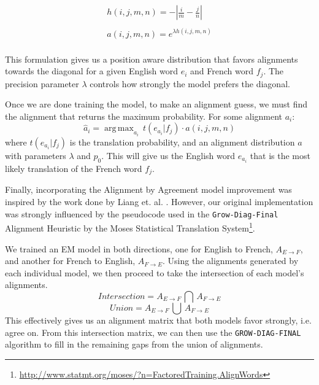 \documentclass[twoside,twocolumn]{article}
\DeclareMathOperator*{\argmax}{arg\,max}
\begin{document}
\begin{equation}
\begin{split}
h(i,j,m,n) = - \left| \frac{i}{m} - \frac{j}{n}\right| \\
\\
a(i,j,m,n) =e^{  \lambda h(i,j,m,n)} \\
\end{split}
\end{equation}

This formulation gives us a position aware distribution that favors alignments towards the diagonal for a given English word $e_i$ and French word $f_j$. The precision parameter $\lambda$ controls how strongly the model prefers the diagonal.

Once we are done training the model, to make an alignment guess, we must find the alignment that returns the maximum probability. For some alignment $a_i$:
\begin{equation}
\hat{a}_i = \argmax_{a_i} \, t(e_{a_i}|f_j) \cdot a(i, j, m, n)
\end{equation}
where $t(e_{a_i}|f_j)$ is the translation probability, and an alignment distribution $a$ with parameters $\lambda$ and $p_0$. This will give us the English word $e_{a_i}$ that is the most likely translation of the French word $f_j$.

Finally, incorporating the Alignment by Agreement model improvement was inspired by the work done by Liang et. al. \cite{liang2006alignment}. However, our original implementation was strongly influenced by the pseudocode used in the \texttt{Grow-Diag-Final} Alignment Heuristic by the Moses Statistical Translation System\footnote{\url{http://www.statmt.org/moses/?n=FactoredTraining.AlignWords}}.

We trained an EM model in both directions, one for English to French, $A_{E \rightarrow F}$, and another for French to English, $A_{F \rightarrow E}$. Using the alignments generated by each individual model, we then proceed to take the intersection of each model's alignments. 
\begin{equation}
Intersection = A_{E \rightarrow F} \, \bigcap \, A_{F \rightarrow E}
\end{equation}
\begin{equation}
Union = A_{E \rightarrow F} \, \bigcup \, A_{F \rightarrow E}
\end{equation}
This effectively gives us an alignment matrix that both models favor strongly, i.e. agree on. From this intersection matrix, we can then use the \texttt{GROW-DIAG-FINAL} algorithm to fill in the remaining gaps from the union of alignments. 
\end{document}
